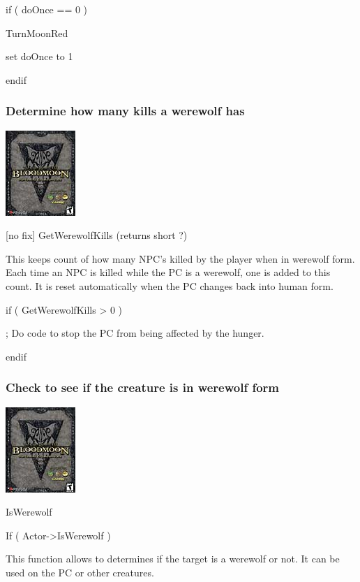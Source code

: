 \documentclass[
]{article}
\begin{document}
if ( doOnce == 0 )

TurnMoonRed

set doOnce to 1

endif

\hypertarget{determine-how-many-kills-a-werewolf-has}{%
\subsubsection{Determine how many kills a werewolf
has}\label{determine-how-many-kills-a-werewolf-has}}

\includegraphics{media/image7.png}

{[}no fix{]} GetWerewolfKills (returns short ?)

This keeps count of how many NPC's killed by the player when in werewolf
form. Each time an NPC is killed while the PC is a werewolf, one is
added to this count. It is reset automatically when the PC changes back
into human form.

if ( GetWerewolfKills \textgreater{} 0 )

; Do code to stop the PC from being affected by the hunger.

endif

\hypertarget{check-to-see-if-the-creature-is-in-werewolf-form}{%
\subsubsection{Check to see if the creature is in werewolf
form}\label{check-to-see-if-the-creature-is-in-werewolf-form}}

\includegraphics{media/image7.png}

IsWerewolf

If ( Actor-\textgreater IsWerewolf )

This function allows to determines if the target is a werewolf or not.
It can be used on the PC or other creatures.
\end{document}

